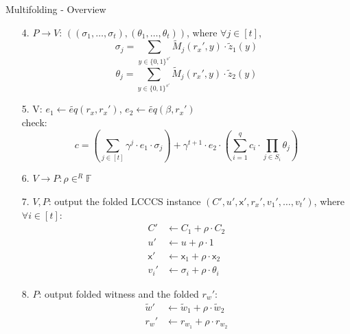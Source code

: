 \documentclass{beamer}
\begin{document}
\begin{frame}{Multifolding - Overview}

  \begin{tiny}
  \begin{enumerate}
    \item[4.] $P \rightarrow V$: $\left( (\sigma_1, \ldots, \sigma_t), (\theta_1, \ldots, \theta_t) \right)$, where $\forall j \in [t]$,
		$$\sigma_j = \sum_{y \in \{0,1\}^{s'}} \widetilde{M}_j(r_x', y) \cdot \widetilde{z}_1(y)$$
		$$\theta_j = \sum_{y \in \{0, 1\}^{s'}} \widetilde{M}_j(r_x', y) \cdot \widetilde{z}_2(y)$$
	      \item[5.] V: $e_1 \leftarrow \widetilde{eq}(r_x, r_x')$, $e_2 \leftarrow \widetilde{eq}(\beta, r_x')$\\
		check:
		$$c = \left(\sum_{j \in [t]} \gamma^j \cdot e_1 \cdot \sigma_j \right) + \gamma^{t+1} \cdot e_2 \cdot \left( \sum_{i=1}^q c_i \cdot \prod_{j \in S_i} \theta_j \right)$$
	      \item[6.] $V \rightarrow P: \rho \in^R \mathbb{F}$
	      \item[7.] $V, P$: output the folded LCCCS instance $(C', u', \mathsf{x}', r_x', v_1', \ldots, v_t')$, where $\forall i \in [t]$:
		\begin{align*}
			C' &\leftarrow C_1 + \rho \cdot C_2\\
			u' &\leftarrow u + \rho \cdot 1\\
			\mathsf{x}' &\leftarrow \mathsf{x}_1 + \rho \cdot \mathsf{x}_2\\
			v_i' &\leftarrow \sigma_i + \rho \cdot \theta_i
		\end{align*}
	      \item[8.] $P$: output folded witness and the folded $r_w'$:
		\begin{align*}
			\widetilde{w}' &\leftarrow \widetilde{w}_1 + \rho \cdot \widetilde{w}_2\\
			r_w' &\leftarrow r_{w_1} + \rho \cdot r_{w_2}
		\end{align*}
  \end{enumerate}
  \end{tiny}

\end{frame}
\end{document}
